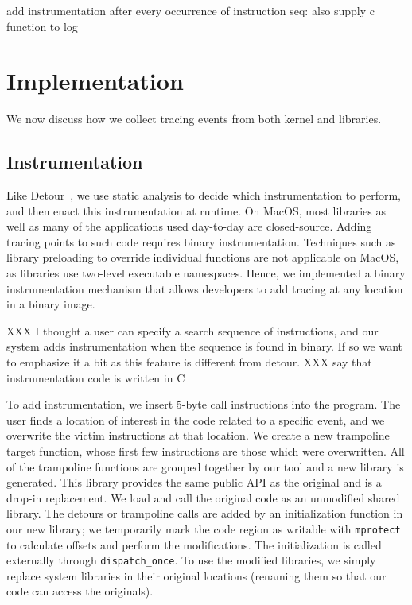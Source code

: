 add instrumentation after every occurrence of instruction seq: also supply c function to log

\section{Implementation}
We now discuss how we collect tracing events from both kernel and libraries.

\subsection{Instrumentation}
Like Detour~\cite{detourXXXXXXXX}, we use static analysis to decide which instrumentation to perform, and then enact this instrumentation at runtime. 
On MacOS, most libraries as well as many of the applications used day-to-day are closed-source.
Adding tracing points to such code requires binary instrumentation.
Techniques such as library preloading to override individual functions are not applicable on MacOS, as libraries use two-level executable namespaces.
Hence, we implemented a binary instrumentation mechanism that allows developers to add tracing at any location in a binary image.

XXX I thought a user can specify a search sequence of instructions, and our system adds instrumentation when the sequence is found in binary.  If so we want to emphasize it a bit as this feature is different from detour.
XXX say that instrumentation code is written in C

To add instrumentation, we insert 5-byte call instructions into the program. The user finds a location of interest in the code related to a specific event,
and we overwrite the victim instructions at that location. We create a new trampoline target function, whose first few instructions are those which were overwritten.
All of the trampoline functions are grouped together by our tool and a new library is generated.
This library provides the same public API as the original and is a drop-in replacement. We load and call the original code as an unmodified shared library.
The detours or trampoline calls are added by an initialization function in our new library; we temporarily mark the code region as writable with \texttt{mprotect}
to calculate offsets and perform the modifications. The initialization is called externally through \texttt{dispatch\_once}.
To use the modified libraries, we simply replace system libraries in their original locations (renaming them so that our code can access the originals).

